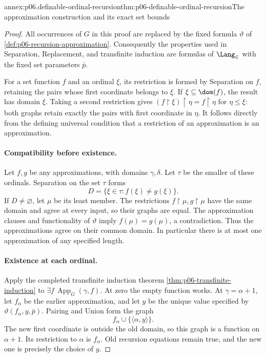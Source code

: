 \begin{annexitem}{annex:p06.definable-ordinal-recursion}{thm:p06-definable-ordinal-recursion}{The approximation construction and its exact set bounds}
\begin{proof}
All occurrences of \(G\) in this proof are replaced by the fixed
formula \(\vartheta\) of
\cref{def:p06-recursion-approximation}.  Consequently the properties
used in Separation, Replacement, and transfinite induction are
formulas of \(\Lang_{\in}\) with the fixed set parameters \(\bar p\).

For a set function \(f\) and an ordinal \(\xi\), its restriction
is formed by Separation on \(f\), retaining the pairs whose first
coordinate belongs to \(\xi\).  If \(\xi\subseteq\dom(f)\), the
result has domain \(\xi\).  Taking a second restriction gives
\((f\mathbin{\upharpoonright}\xi)\mathbin{\upharpoonright}\eta=f\mathbin{\upharpoonright}\eta\) for \(\eta\leq\xi\):
both graphs retain exactly the pairs with first coordinate in
\(\eta\).  It follows directly from the defining universal
condition that a restriction of an approximation is an approximation.

\paragraph{Compatibility before existence.}
Let \(f,g\) be any approximations, with domains \(\gamma,\delta\).
Let \(\tau\) be the smaller of these ordinals.  Separation on
the set \(\tau\) forms
\[
 D=\{\xi\in\tau:f(\xi)\ne g(\xi)\}.
\]
If \(D\ne\varnothing\), let \(\mu\) be its least member.
The restrictions \(f\mathbin{\upharpoonright}\mu,g\mathbin{\upharpoonright}\mu\) have the same domain
and agree at every input, so their graphs are equal.  The
approximation clauses and functionality of \(\vartheta\) imply
\(f(\mu)=g(\mu)\), a contradiction.  Thus the approximations
agree on their common domain.  In particular there is at most one
approximation of any specified length.

\paragraph{Existence at each ordinal.}
Apply the completed transfinite induction theorem
\cref{thm:p06-transfinite-induction} to
\(\exists f\,\operatorname{App}_G(\gamma,f)\).
At zero the empty function works.  At \(\gamma=\alpha+1\), let
\(f_\alpha\) be the earlier approximation, and let \(y\) be the
unique value specified by \(\vartheta(f_\alpha,y,\bar p)\).
Pairing and Union form the graph
\[
 f_\alpha\cup\{\langle\alpha,y\rangle\}.
\]
The new first coordinate is outside the old domain, so this graph
is a function on \(\alpha+1\).  Its restriction to \(\alpha\)
is \(f_\alpha\).  Old recursion equations remain true, and the
new one is precisely the choice of \(y\).


\end{proof}
\end{annexitem}
